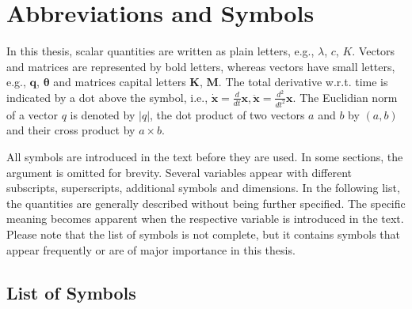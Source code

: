 \cleardoublepage{}
\chapter*{Abbreviations and Symbols}

In this thesis, scalar quantities are written as plain letters, e.g., $\lambda$, $c$, $K$.
Vectors and matrices are represented by bold letters, whereas vectors have small letters, e.g., $\boldsymbol{q}$, $\boldsymbol{\theta}$ and matrices capital letters $\boldsymbol{K}$, $\boldsymbol{M}$.
The total derivative w.r.t. time is indicated by a dot above the symbol, i.e., $\dot{\boldsymbol{x}}=\frac{d}{dt}\boldsymbol{x},\ddot{\boldsymbol{x}}=\frac{d^2}{dt^2}\boldsymbol{x}$.
The Euclidian norm of a vector $q$ is denoted by $\vert q \vert$, the dot product of two vectors $a$ and $b$ by $(a,b)$ and their cross product by $a \times b$.

All symbols are introduced in the text before they are used.
In some sections, the argument is omitted for brevity.
Several variables appear with different subscripts, superscripts, additional symbols and dimensions.
In the following list, the quantities are generally described without being further specified.
The specific meaning becomes apparent when the respective variable is introduced in the text.
Please note that the list of symbols is not complete, but it contains symbols that appear frequently or are of major importance in this thesis.

\section*{List of Symbols}

